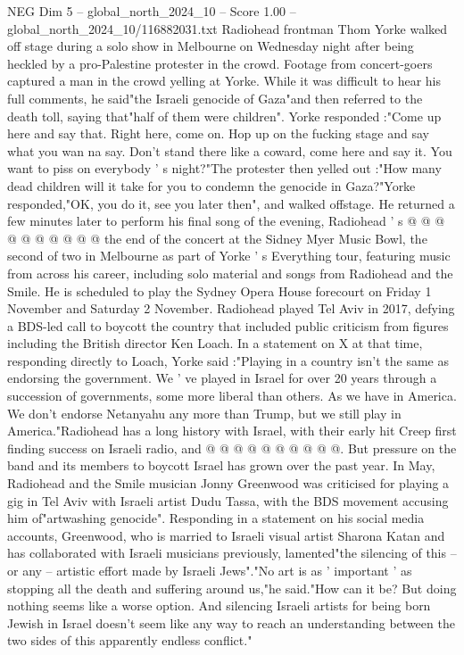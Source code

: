 \begin{textsample}{NEG Dim 5 – global\_north\_2024\_10 – Score 1.00 – global\_north\_2024\_10/116882031.txt}  \label{ex:f5_neg_047}
Radiohead frontman Thom Yorke walked off stage during a solo show in Melbourne on Wednesday night after being heckled by a pro-Palestine protester in the crowd.
Footage from concert-goers captured a man in the crowd yelling at Yorke.
While it was difficult to hear his full comments, he said"the Israeli genocide of Gaza"and then referred to the death toll, saying that"half of them were children".
Yorke responded :"Come up here and say that.
Right here, come on.
Hop up on the fucking stage and say what you wan na say.
Don't stand there like a coward, come here and say it.
You want to piss on everybody ' s night?"The protester then yelled out :"How many dead children will it take for you to condemn the genocide in Gaza?"Yorke responded,"OK, you do it, see you later then", and walked offstage.
He returned a few minutes later to perform his final song of the evening, Radiohead ' s @ @ @ @ @ @ @ @ @ @ the end of the concert at the Sidney Myer Music Bowl, the second of two in Melbourne as part of Yorke ' s Everything tour, featuring music from across his career, including solo material and songs from Radiohead and the Smile.
He is scheduled to play the Sydney Opera House forecourt on Friday 1 November and Saturday 2 November.
Radiohead played Tel Aviv in 2017, defying a BDS-led call to boycott the country that included public criticism from figures including the British director Ken Loach.
In a statement on X at that time, responding directly to Loach, Yorke said :"Playing in a country isn't the same as endorsing the government.
We ' ve played in Israel for over 20 years through a succession of governments, some more liberal than others.
As we have in America.
We don't endorse Netanyahu any more than Trump, but we still play in America."Radiohead has a long history with Israel, with their early hit Creep first finding success on Israeli radio, and @ @ @ @ @ @ @ @ @ @.
But pressure on the band and its members to boycott Israel has grown over the past year.
In May, Radiohead and the Smile musician Jonny Greenwood was criticised for playing a gig in Tel Aviv with Israeli artist Dudu Tassa, with the BDS movement accusing him of"artwashing genocide".
Responding in a statement on his social media accounts, Greenwood, who is married to Israeli visual artist Sharona Katan and has collaborated with Israeli musicians previously, lamented"the silencing of this -- or any -- artistic effort made by Israeli Jews"."No art is as ' important ' as stopping all the death and suffering around us,"he said."How can it be?
But doing nothing seems like a worse option.
And silencing Israeli artists for being born Jewish in Israel doesn't seem like any way to reach an understanding between the two sides of this apparently endless conflict."

\end{textsample}

